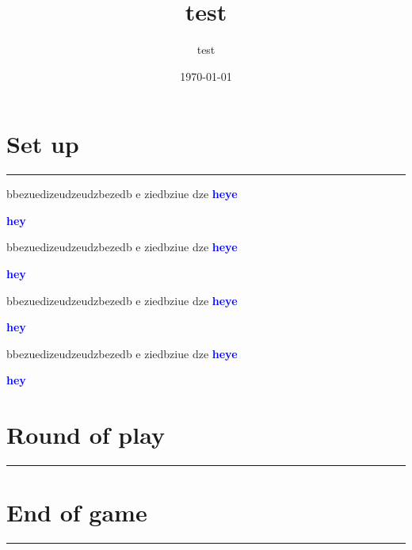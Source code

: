 \documentclass{article}%
\title{test}%
\author{test}%
\date{\today}%
\begin{document}
%
\normalsize%
\maketitle\thispagestyle{header}%
\pagestyle{header}%
\sectionfont{\color{blue}}%
\subsectionfont{\color{blue}}%
\subsubsectionfont{\color{blue}}%
\section{ Set up
}%
\label{sec:Setup}%
\textcolor{blue}{\rule{18cm}{0.07cm}}\break%
bbezuedizeudzeudzbezedb e ziedbziue dze %
\textcolor{blue}{%
\textbf{heye}%
}%

%
\textcolor{blue}{%
\textbf{hey}%
}%

%
bbezuedizeudzeudzbezedb e ziedbziue dze %
\textcolor{blue}{%
\textbf{heye}%
}%

%
\textcolor{blue}{%
\textbf{hey}%
}%

%
bbezuedizeudzeudzbezedb e ziedbziue dze %
\textcolor{blue}{%
\textbf{heye}%
}%

%
\textcolor{blue}{%
\textbf{hey}%
}%

%
bbezuedizeudzeudzbezedb e ziedbziue dze %
\textcolor{blue}{%
\textbf{heye}%
}%

%
\textcolor{blue}{%
\textbf{hey}%
}%



%
\sectionfont{\color{mygreen}}%
\subsectionfont{\color{mygreen}}%
\subsubsectionfont{\color{mygreen}}%
\section{ Round of play
}%
\label{sec:Roundofplay}%
\textcolor{mygreen}{\rule{18cm}{0.07cm}}\break

%
\sectionfont{\color{red}}%
\subsectionfont{\color{red}}%
\subsubsectionfont{\color{red}}%
\section{ End of game}%
\label{sec:Endofgame}%
\textcolor{red}{\rule{18cm}{0.07cm}}\break

%
\end{document}
